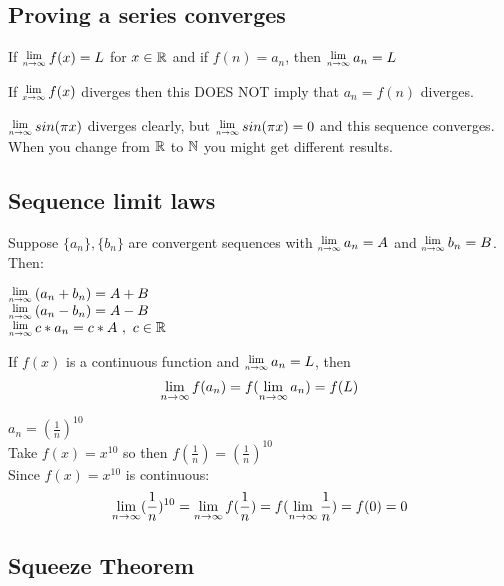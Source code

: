 \documentclass[12 pt]{article}
\begin{document}
		\subsection{Proving a series converges}
		\begin{thrm}
			If $\Lim{n\toinfty}f(x)=L$ for $x\in\mathbb{R}$ and if $f(n)=a_n$,
			then $\Lim{n\toinfty}a_n=L$
		\end{thrm}

		\begin{remark}
			If $\Lim{x\toinfty}f(x)$ diverges then this DOES NOT imply that
			$a_n=f(n)$ diverges.
		\end{remark}
		\begin{exmp*}
			$\Lim{n\toinfty}sin(\pi x)$ diverges clearly, but
			$\Lim{n\toinfty}sin(\pi x) = 0$ and this sequence converges.
			When you change from $\mathbb{R}$ to $\mathbb{N}$ you might get different results.
		\end{exmp*}

		\subsection{Sequence limit laws}

		Suppose $\{a_n\},\{b_n\}$ are convergent sequences with $\Lim{n\toinfty}
		a_n=A$ and $\Lim{n\toinfty}b_n=B$. Then:
		\begin{center}$\Lim{n\toinfty}(a_n+b_n)=A+B$\\
			$\Lim{n\toinfty}(a_n-b_n)=A-B$\\
			$\Lim{n\toinfty}c*a_n=c*A\ ,\ c\in\R$
		\end{center}
		\begin{thrm}If $f(x)$ is a continuous function and $\Lim{n\toinfty}a_n=L$,
			then\\ $$\lim_{n\rightarrow\infty}f(a_n)=f(\lim_{n\rightarrow\infty}a_n)=f(L)$$
		\end{thrm}
		\begin{exmp*}
			$a_n=(\frac{1}{n})^{10}$\\
			Take $f(x)=x^{10}$ so then $f(\frac{1}{n})=(\frac{1}{n})^{10}$\\
			Since $f(x)=x^{10}$ is continuous:
			$$\lim_{n\rightarrow\infty}(\frac{1}{n})^{10}=\lim_{n\rightarrow\infty}f(\frac{1}{n})=f(\lim_{n\rightarrow\infty}\frac{1}{n})=f(0)=0$$
		\end{exmp*}

		\subsection{Squeeze Theorem}
\end{document}
